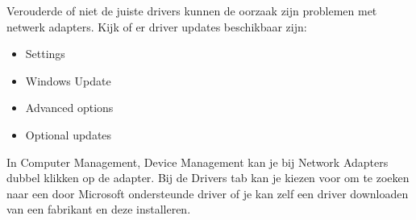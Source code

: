 Verouderde of niet de juiste drivers kunnen de oorzaak zijn problemen met netwerk adapters. Kijk of er driver updates beschikbaar zijn:
\begin{itemize}
\item Settings
\item Windows Update
\item Advanced options
\item Optional updates
\end{itemize}

In Computer Management, Device Management kan je bij Network Adapters dubbel klikken op de adapter. Bij de Drivers tab kan je kiezen voor om te zoeken naar een door Microsoft ondersteunde driver of je kan zelf een driver downloaden van een fabrikant en deze installeren.

